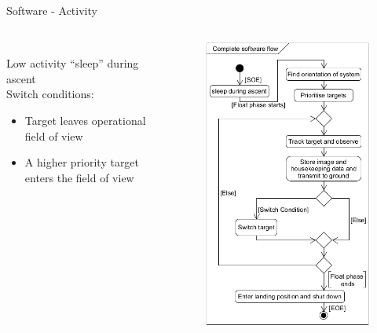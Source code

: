 \documentclass[11pt, aspectratio=169]{beamer}
\begin{document}
\begin{frame}[c]{Software - Activity}
    \centering
    \begin{columns}[t]
        \begin{column}{.5\textwidth}
            \vspace{1cm}\\
            Low activity ``sleep'' during ascent\\
            \vspace{1cm}
                Switch conditions:
                \begin{itemize}
                    \item Target leaves operational field of view
                    \item A higher priority target enters the field of view
                \end{itemize}
        \end{column}

        \begin{column}{.5\textwidth}
            \vspace{-1 cm}
            \begin{figure}
                \includegraphics[height=.9\textheight]{software/activity-diagram.png}
            \end{figure}
        \end{column}
    \end{columns}
\end{frame}
\end{document}
